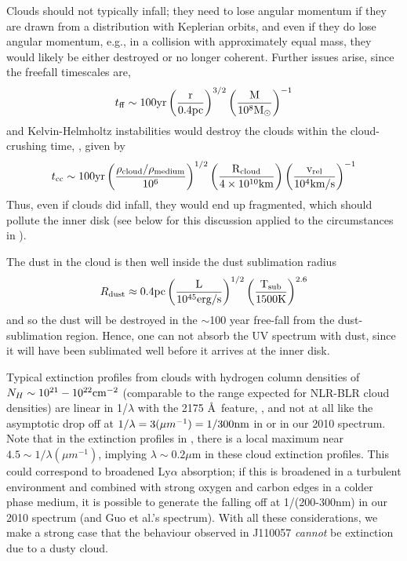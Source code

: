 \documentclass[11pt,a4paper]{article}
\begin{document}
Clouds should not typically infall; they need to lose angular momentum
if they are drawn from a distribution with Keplerian orbits, and even
if they do lose angular momentum, e.g., in a collision with
approximately equal mass, they would likely be either destroyed or no
longer coherent. Further issues 
arise, since the freefall timescales
are,
\begin{equation}
    t_{{\rm ff}}   \sim 100   \rm{yr}  \left(\frac{r}{0.4\rm{pc}}\right)^{3/2} 
                                            \left(\frac{M}{10^{8}M_{\odot}}\right)^{-1}
\end{equation}
and Kelvin-Helmholtz instabilities would destroy the clouds within the
cloud-crushing time, \citep[e.g., ][]{Nagakura2008, Hopkins2013,
Shiokawa2015, Bae2016},
given by
\begin{equation}
    t_{\rm cc} \sim 100\rm{yr} \left(\frac{\rho_{cloud}/\rho_{medium}}{10^{6}}\right)^{1/2} 
                                            \left(\frac{R_{\rm cloud}}{4 \times 10^{10}\rm{km}}\right) 
                                            \left(\frac{v_{\rm rel}}{10^{4}\rm{km/s}}\right)^{-1}
\end{equation}
Thus, even if clouds did infall, they would end up fragmented, which
should pollute the inner disk (see below for this discussion applied
to the circumstances in \citet{Guo2016}).

The dust in the cloud is then well inside the dust sublimation radius
\begin{equation}
    R_{\rm dust} \approx 0.4\rm{pc}\left(\frac{L}{10^{45}\rm{erg/s}}\right)^{1/2}
                                                   \left(\frac{T_{\rm sub}}{1500\rm{K}}\right)^{2.6}
\end{equation}
and so the dust will be destroyed in the $\sim$100 year free-fall from
the dust-sublimation region. Hence, one can not absorb the UV spectrum
with dust, since it will have been sublimated well before it arrives
at the inner disk.

Typical extinction profiles from clouds with hydrogen column densities
of $N_{H} \sim 10^{21}-10^{22} \rm{cm}^{-2}$ (comparable to the range
expected for NLR-BLR cloud densities) are linear in 
1/$\lambda$ with the 2175 \AA\ feature, \citep[e.g., Figure 4
of][]{Gordon2003}, and not at all like the asymptotic drop off at
$1/\lambda=3 (\mu m^{-1})=1/300\rm{nm}$ in \citet{Guo2016} or in our
2010 spectrum. Note that in the extinction profiles in
\citet{Gordon2003}, there is a local maximum near $4.5 \sim 1/\lambda (\mu
m^{-1})$, implying $\lambda \sim 0.2\mu$m in these
cloud extinction profiles. %
This could correspond to broadened Ly$\alpha$ absorption;
if this is broadened in a turbulent environment and combined with
strong oxygen and carbon edges in a colder phase medium, it is possible to
generate the falling off at 1/(200-300nm) in our 2010 spectrum (and
Guo et al.'s spectrum). With all these considerations, we make a strong case
that the behaviour observed in J110057 \emph{cannot} be extinction due
to a dusty cloud.
\end{document}

